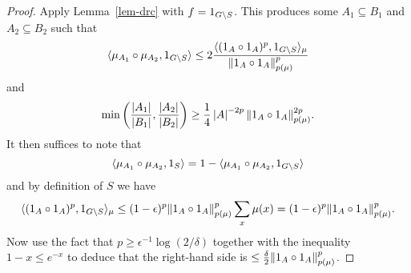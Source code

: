 \begin{proof}
\leanok
Apply Lemma~\ref{lem-drc} with $f=1_{G\backslash S}$. This produces some $A_1\subseteq B_1$ and $A_2\subseteq B_2$ such that
\[\langle \mu_{A_1}\circ \mu_{A_2}, 1_{G\backslash S}\rangle\leq 2\frac{\langle (1_{A}\circ 1_{A})^p,1_{G\backslash S}\rangle_\mu}{\lVert 1_{A}\circ 1_{A}\rVert_{p(\mu)}^p}\]
and
\[\min\left( \frac{\left\lvert A_1\right\rvert}{\left\lvert B_1\right\rvert},\frac{\left\lvert A_2\right\rvert}{\left\lvert B_2\right\rvert}\right)\geq \frac{1}{4}\left\lvert A\right\rvert^{-2p}\lVert 1_{A}\circ 1_{A}\rVert_{p(\mu)}^{2p}.\]
It then suffices to note that
\[\langle \mu_{A_1}\circ \mu_{A_2},1_{S}\rangle=1-\langle \mu_{A_1}\circ \mu_{A_2},1_{G\backslash S}\rangle\]
and by definition of $S$ we have
\[\langle (1_{A}\circ 1_{A})^p,1_{G\backslash S}\rangle_\mu\leq (1-\epsilon)^p\lVert 1_{A}\circ 1_{A}\rVert_{p(\mu)}^p\sum_{x}\mu(x)=(1-\epsilon)^p\lVert 1_{A}\circ 1_{A}\rVert_{p(\mu)}^p.\]
Now use the fact that $p\geq \epsilon^{-1}\log(2/\delta)$ together with the inequality $1-x\leq e^{-x}$ to deduce that the right-hand side is $\leq \tfrac{\delta}{2}\lVert 1_{A}\circ 1_{A}\rVert_{p(\mu)}^p$.
\end{proof}
